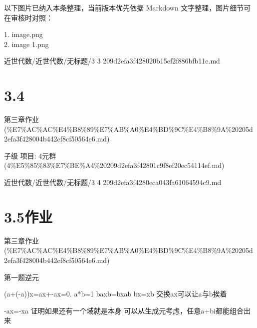\begin{note}[关联图片]
以下图片已纳入本条整理，当前版本优先依据 Markdown 文字整理，图片细节可在审核时对照：

1. image.png\\
2. image 1.png\\

\end{note}

\begin{note}[来源路径]

近世代数/近世代数/无标题/3 3 209d2efa3f428020b15ef2f886bfb11e.md

\end{note}

\section*{3.4}

\begin{note}[来源上级主题]

第三章作业 (\%E7\%AC\%AC\%E4\%B8\%89\%E7\%AB\%A0\%E4\%BD\%9C\%E4\%B8\%9A\%20205d2efa3f428004b442cf8cf50564e6.md)

\end{note}

\begin{homework}

子级 项目: 4元群 (4\%E5\%85\%83\%E7\%BE\%A4\%20209d2efa3f42801c9f8ef20ec54114ef.md)

\end{homework}

\begin{note}[来源路径]

近世代数/近世代数/无标题/3 4 209d2efa3f4280eca043fa61064594c9.md

\end{note}

\section*{3.5作业}

\begin{note}[来源上级主题]

第三章作业 (\%E7\%AC\%AC\%E4\%B8\%89\%E7\%AB\%A0\%E4\%BD\%9C\%E4\%B8\%9A\%20205d2efa3f428004b442cf8cf50564e6.md)

\end{note}

\begin{homework}

第一题逆元

(a+(-a))x=ax+-ax=0.  a*b=1 baxb=bxab  bx=xb 交换ax可以让a与b挨着

-ax=-xa                   证明如果还有一个域就是本身 可以从生成元考虑，任意a+bi都能组合出来

\end{homework}

